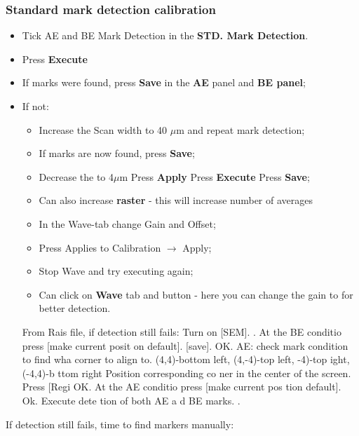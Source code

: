 \subsubsection{Standard mark detection calibration}
\label{sec:stand-mark-detect}

\begin{itemize}
\item Tick AE and BE Mark Detection in the \textbf{STD.  Mark Detection}.
\item Press \textbf{Execute}
\item If  marks were  found, press  \textbf{Save} in  the \textbf{AE}  panel and
  \textbf{BE panel};
\item If not:
  \begin{itemize}
  \item Increase the Scan width to 40 $\mu$m and repeat mark detection;
  \item If marks are now found, press \textbf{Save};
  \item   Decrease  the   to  4$\mu$m   \ira  Press   \textbf{Apply}  \ira   Press
    \textbf{Execute} \ira Press \textbf{Save};
  \item  Can  also increase  \textbf{raster}  -  this  will increase  number  of
    averages
  \item In the {Wave}-tab change Gain and Offset;
  \item Press {Applies to Calibration}  $\rightarrow$ Apply;
  \item Stop Wave and try executing again;
  \item Can click on \textbf{Wave} tab and button - here you can change the gain
    to for better detection.
  \end{itemize}
  \begin{framed}\noindent
    From Rais  file, if  detection still  fails: Turn  on [SEM].   .  At  the BE
    conditio press [make current posit on default].  [save].  OK. AE: check mark
    condition to  find wha corner  to align to.  {(4,4)-bottom  left, (4,-4)-top
      left, -4)-top ight, (-4,4)-b ttom  right} Position corresponding co ner in
    the center of  the screen.  Press [Regi  OK. At the AE  conditio press [make
    current pos tion default].  Ok.  Execute dete  tion of both AE a d BE marks.
    .
  \end{framed}
\end{itemize}

If detection still fails, time to find markers manually:

